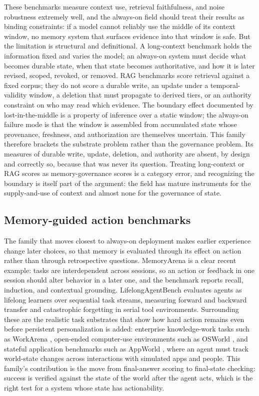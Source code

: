 These benchmarks measure context use, retrieval faithfulness, and noise robustness extremely well, and the always-on field should treat their results as binding constraints: if a model cannot reliably use the middle of its context window, no memory system that surfaces evidence into that window is safe. But the limitation is structural and definitional. A long-context benchmark holds the information fixed and varies the model; an always-on system must decide what becomes durable state, when that state becomes authoritative, and how it is later revised, scoped, revoked, or removed. RAG benchmarks score retrieval against a fixed corpus; they do not score a durable write, an update under a temporal-validity window, a deletion that must propagate to derived tiers, or an authority constraint on who may read which evidence. The boundary effect documented by lost-in-the-middle is a property of inference over a static window; the always-on failure mode is that the window is assembled from accumulated state whose provenance, freshness, and authorization are themselves uncertain. This family therefore brackets the substrate problem rather than the governance problem. Its measures of durable write, update, deletion, and authority are absent, by design and correctly so, because that was never its question. Treating long-context or RAG scores as memory-governance scores is a category error, and recognizing the boundary is itself part of the argument: the field has mature instruments for the supply-and-use of context and almost none for the governance of state.

\subsection{Memory-guided action benchmarks}

The family that moves closest to always-on deployment makes earlier experience change later choices, so that memory is evaluated through its effect on action rather than through retrospective questions. MemoryArena \citep{he2026memoryarena} is a clear recent example: tasks are interdependent across sessions, so an action or feedback in one session should alter behavior in a later one, and the benchmark reports recall, induction, and contextual grounding. LifelongAgentBench \citep{zheng2025lifelongagentbenchevaluatingllmagents} evaluates agents as lifelong learners over sequential task streams, measuring forward and backward transfer and catastrophic forgetting in serial tool environments. Surrounding these are the realistic task substrates that show how hard action remains even before persistent personalization is added: enterprise knowledge-work tasks such as WorkArena \citep{boisvert2024workarena}, open-ended computer-use environments such as OSWorld \citep{xie2024osworldbenchmarkingmultimodalagents}, and stateful application benchmarks such as AppWorld \citep{trivedi-etal-2024-appworld}, where an agent must track world-state changes across interactions with simulated apps and people. This family's contribution is the move from final-answer scoring to final-state checking: success is verified against the state of the world after the agent acts, which is the right test for a system whose state has actionability.

